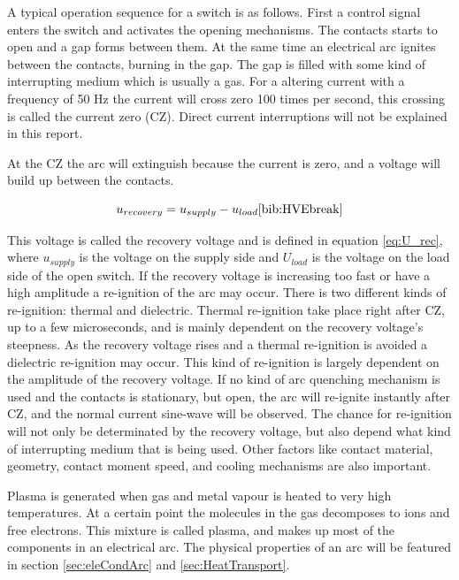\documentclass[10pt,a4paper]{article}
\begin{document}
A typical operation sequence for a switch is as follows. First a control signal enters the switch and activates the opening mechanisms. The contacts starts to open and a gap forms between them. At the same time an electrical arc ignites between the contacts, burning in the gap. The gap is filled with some kind of interrupting medium which is usually a gas. For a altering current with a frequency of 50 Hz the current will cross zero 100 times per second, this crossing is called the current zero (CZ). Direct current interruptions will not be explained in this report. 

At the CZ the arc will extinguish because the current is zero, and a voltage will build up between the contacts.

\begin{equation} \label{eq:U_rec}
u_{recovery}=u_{supply}-u_{load} \cite{bib:HVEbreak}
\end{equation} 

 This voltage is called the recovery voltage and is defined in equation \eqref{eq:U_rec}, where $u_{supply}$ is the voltage on the supply side and $U_{load}$ is the voltage on the load side of the open switch. If the recovery voltage is increasing too fast or have a high amplitude a re-ignition of the arc may occur. There is two different kinds of re-ignition: thermal and dielectric. Thermal re-ignition take place right after CZ, up to a few microseconds, and is mainly dependent on the recovery voltage's steepness. As the recovery voltage rises and a thermal re-ignition is avoided a dielectric re-ignition may occur. This kind of re-ignition is largely dependent on the amplitude of the recovery voltage. If no kind of arc quenching mechanism is used and the contacts is stationary, but open, the arc will re-ignite instantly after CZ, and the normal current sine-wave will be observed. The chance for re-ignition will not only be determinated by the recovery voltage, but also depend what kind of interrupting medium that is being used. Other factors like contact material, geometry, contact moment speed, and cooling mechanisms are also important.

Plasma is generated when gas and metal vapour is heated to very high temperatures. At a certain point the molecules in the gas decomposes to ions and free electrons. This mixture is called plasma, and makes up most of the components in an electrical arc. The physical properties of an arc will be featured in section \ref{sec:eleCondArc} and \ref{sec:HeatTransport}. 
\end{document}
